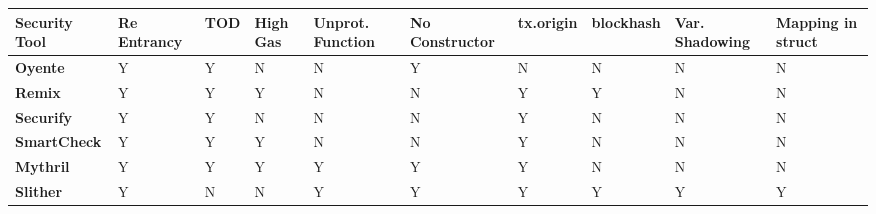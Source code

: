 \begin{table}[H]
	\caption{Slither is able to detect more vulnerabilities compared to other tools.}
	\centering
	\scriptsize
	\setlength\LTleft{-1in}
	\setlength\LTright{-1in}
	\begin{longtable}{C{0.12\textwidth}
					  C{0.10\textwidth} C{0.10\textwidth}
					  C{0.10\textwidth} C{0.10\textwidth}
					  C{0.10\textwidth} C{0.11\textwidth}
					  C{0.10\textwidth} C{0.10\textwidth}
					  C{0.10\textwidth}}
		\hline
		\textbf{Security Tool} & 
		\textbf{Re Entrancy} & 
		\textbf{TOD} &  
		\textbf{High Gas} &
		\textbf{Unprot. Function} & 
		\textbf{No Constructor} & 
		\textbf{tx.origin} & 
		\textbf{blockhash} & 
		\textbf{Var. Shadowing} &
		\textbf{Mapping in struct}
		\\
		\hline
		\textbf{Oyente} &
			Y & Y & N & 
			N & Y & N & 
			N & N & N
			\\ \hline

		\textbf{Remix} &
			Y & Y & Y & 
			N & N & Y & 
			Y & N & N 
			\\ \hline

		\textbf{Securify} &
			Y & Y & N & 
			N & N & Y & 
			N & N & N 
			\\ \hline

		\textbf{SmartCheck} &
			Y & Y & Y & 
			N & N & Y & 
			N & N & N 
			\\ \hline

		\textbf{Mythril} &
			Y & Y & Y & 
			Y & Y & Y & 
			N & N & N 
			\\ \hline

		\textbf{Slither} &
			Y & N & N & 
			Y & Y & Y & 
			Y & Y & Y 
			\\ \hline
	\end{longtable}
	\label{table:slither}
\end{table}
